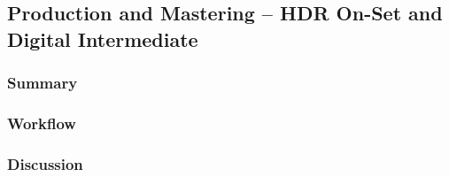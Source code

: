 \subsection{Production and Mastering -- HDR On-Set and Digital Intermediate} \label{subsec:ff-onset-di-hdr}

	\subsubsection{Summary}
	
	\lipsum[1] %
	
	\subsubsection{Workflow}
	
	\lipsum[1] %
	
	\subsubsection{Discussion}
	
	\lipsum[1] %
	
